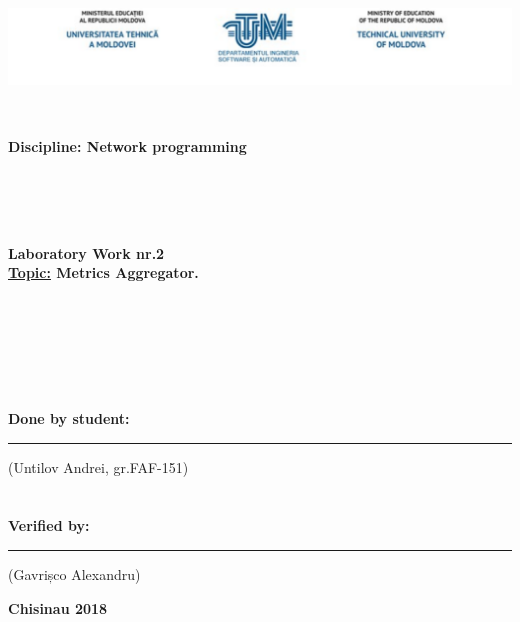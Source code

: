 
\begin{center}
	\includegraphics[scale=0.5]{img_title_amsi} 
\end{center} 
\ \\
\begin{flushright}
	\textbf{{\fontsize{14}{10}\selectfont Discipline: Network programming}}
\end{flushright}
\ \\
\ \\
\ \\

\begin{center}
	\textbf{{\fontsize{15}{10}\selectfont Laboratory Work nr.2 \\
	\underline{Topic:} Metrics Aggregator.}}
\end{center}
\ \\
\ \\
\ \\
\ \\
\ \\
\begin{flushright}
	{\fontsize{12}{10}\selectfont 
		\textbf{Done by student:}  \rule{2cm}{0.4pt}(Untilov Andrei, gr.FAF-151) \\
		\ \\
		\ \\
		\textbf{Verified by:}      \rule{2cm}{0.4pt}(Gavrișco Alexandru)
		
		}
\end{flushright}
\vfill

\begin{center}
	\textbf{Chisinau 2018}
\end{center}
